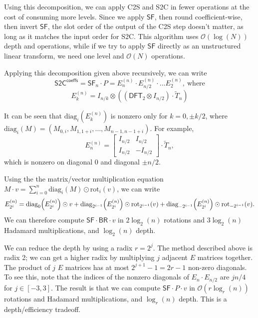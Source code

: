 \documentclass[../fheimpl.tex]{subfiles}
\begin{document}
    Using this decomposition, we can apply C2S and S2C in fewer operations at the cost of consuming more levels.
    Since we apply $\mathsf{SF}$, then round coefficient-wise, then invert $\mathsf{SF}$, the slot order of the output of the C2S step doesn't matter, as long as it matches the input order for S2C. This algorithm uses $\mathcal{O}(\log(N))$ depth and operations, while if we try to apply $\mathsf{SF}$ directly as an unstructured linear transform, we need one level and $\mathcal{O}(N)$ operations.
    
    
    Applying this decomposition given above recursively, we can write
    \[\mathsf{S2C}^\mathsf{coeffs}=\mathsf{SF}_n\cdot P = E_n^{(n)}\cdot E_{n/2}^{(n)}\cdot\ldots E_2^{(n)},\ \text{where}\]
    \[E_k^{(n)} = I_{n/k}\otimes ((\mathsf{DFT}_2\otimes I_{n/2})\cdot \tilde{T}_{n})\]
    
    It can be seen that $\mathrm{diag}_i(E_k^{(n)})$ is nonzero only for $k=0, \pm k/2$, where $\mathrm{diag}_i(M) = (M_{0, i}, M_{1, 1+i}, \ldots , M_{n-1, n-1+i})$. For example, 
    \[E_n^{(n)} = \begin{bmatrix}
    	I_{n/2} & I_{n/2} \\
    	I_{n/2} & -I_{n/2}
    \end{bmatrix}\cdot \tilde{T}_n,\]
    which is nonzero on diagonal 0 and diagonal $\pm n/2$.
    
    Using the the matrix/vector multiplication equation $M\cdot v = \sum_{i=0}^n \mathrm{diag}_i(M)\odot \mathrm{rot}_i(v)$, we can write 
    \[E_{2^i}^{(n)} = \mathrm{diag}_0\parens*{E_{2^i}^{(n)}}\odot v + \mathrm{diag}_{2^{i-1}}\parens*{E_{2^i}^{(n)}}\odot \mathrm{rot}_{2^{i-1}}(v) + \mathrm{diag}_{-2^{i-1}}\parens*{E_{2^i}^{(n)}}\odot \mathrm{rot}_{-2^{i-1}}(v).\]
    We can therefore compute $\mathsf{SF}\cdot \mathsf{BR} \cdot v$ in $2\log_2(n)$ rotations and $3\log_2(n)$ Hadamard multiplications, and $\log_2(n)$ depth.
    
    We can reduce the depth by using a radix $r=2^j$. The method described above is radix 2; we can get  a higher radix by multiplying $j$ adjacent $E$ matrices together. The product of $j$ $E$ matrices has at most $2^{j+1}-1=2r-1$ non-zero diagonals. To see this, note that the indices of the nonzero diagonals of $E_n\cdot E_{n/2}$ are $jn/4$ for $j\in[-3,3]$. The result is that we can compute $\mathsf{SF}\cdot P \cdot v$ in $\mathcal{O}(r\log_r(n))$ rotations and Hadamard multiplications, and $\log_r(n)$ depth. This is a depth/efficiency tradeoff.
    
\end{document}
